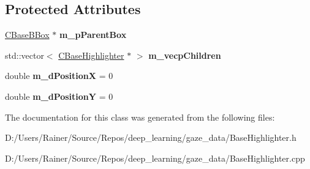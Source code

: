 \subsection*{Protected Attributes}
\begin{DoxyCompactItemize}
\item 
\mbox{\label{class_c_base_highlighter_a50d2c04e5cea521c2973736d05bf6fc9}} 
\hyperlink{class_c_base_b_box}{C\+Base\+B\+Box} $\ast$ {\bfseries m\+\_\+p\+Parent\+Box}
\item 
\mbox{\label{class_c_base_highlighter_ad58879d75792699960746b0ee3730b51}} 
std\+::vector$<$ \hyperlink{class_c_base_highlighter}{C\+Base\+Highlighter} $\ast$ $>$ {\bfseries m\+\_\+vecp\+Children}
\item 
\mbox{\label{class_c_base_highlighter_ab01e3e5c513dcf32c344d7f775c93638}} 
double {\bfseries m\+\_\+d\+PositionX} = 0
\item 
\mbox{\label{class_c_base_highlighter_a53f8a33847b74f021585eb1009ee0b33}} 
double {\bfseries m\+\_\+d\+PositionY} = 0
\end{DoxyCompactItemize}


The documentation for this class was generated from the following files\+:\begin{DoxyCompactItemize}
\item 
D\+:/\+Users/\+Rainer/\+Source/\+Repos/deep\+\_\+learning/gaze\+\_\+data/Base\+Highlighter.\+h\item 
D\+:/\+Users/\+Rainer/\+Source/\+Repos/deep\+\_\+learning/gaze\+\_\+data/Base\+Highlighter.\+cpp\end{DoxyCompactItemize}
